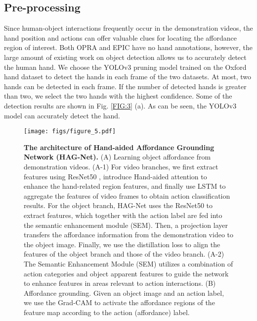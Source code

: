 \documentclass[journal,twoside]{IEEEtran}
\begin{document}
\subsection{Pre-processing}
\label{3.1}

Since human-object interactions frequently occur in the demonstration videos, the hand position and actions can offer valuable clues for locating the affordance region of interest. Both OPRA \cite{demo2vec2018cvpr} and EPIC \cite{Damen2018EPICKITCHENS} have no hand annotations, however, the large amount of existing work on object detection \cite{yolov3,chen2020recursive,ren2016faster} allows us to accurately detect the human hand. We choose the YOLOv3 pruning model \cite{yolov3,Liu2017learning} trained on the Oxford hand dataset \cite{DBLP:conf/bmvc/MittalZT11} to detect the hands in each frame of the two datasets. At most, two hands can be detected in each frame. If the number of detected hands is greater than two, we select the two hands with the highest confidence. Some of the detection results are shown in Fig. \ref{FIG:3} (a). As can be seen, the YOLOv3 model can accurately detect the hand.

\begin{figure*}[t]
	\centering
		\texttt{[image: figs/figure\_5.pdf]}
	\caption{\textbf{The architecture of Hand-aided Affordance Grounding Network (HAG-Net).} (A) Learning object affordance from demonstration videos. (A-1) For video branches, we first extract features using ResNet50 \cite{DBLP:conf/cvpr/HeZRS16}, introduce Hand-aided attention to enhance the hand-related region features, and finally use LSTM to aggregate the features of video frames to obtain action classification results. For the object branch, HAG-Net uses the ResNet50 to extract features, which together with the action label are fed into the semantic enhancement module (SEM). Then, a projection layer transfers the affordance information from the demonstration video to the object image. Finally, we use the distillation loss to align the features of the object branch and those of the video branch. (A-2) The Semantic Enhancement Module (SEM) utilizes a combination of action categories and object apparent features to guide the network to enhance features in areas relevant to action interactions. (B) Affordance grounding. Given an object image and an action label, we use the Grad-CAM to activate the affordance regions of the feature map according to the action (affordance) label.}
	\label{FIG:5}
\end{figure*}
\end{document}
